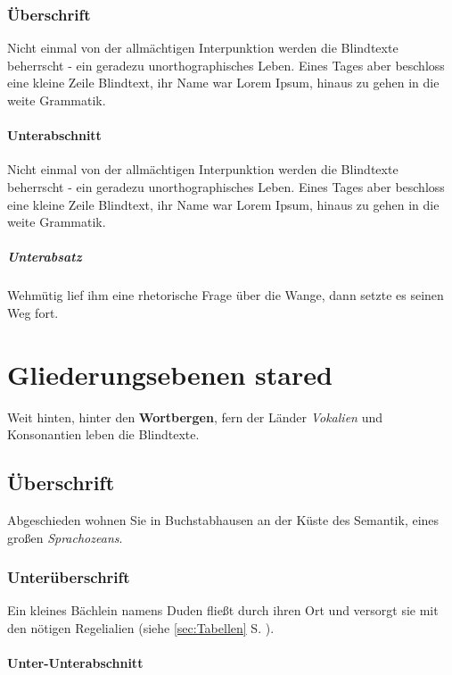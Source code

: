 \documentclass[%
	12pt,%
	a4paper,%
	oneside,%
	liststotoc, idxtotoc, bibtotoc, %
	parskip=half,%
	nochapterprefix,%
	appendixprefix, %
	headings=small,%
]{scrreprt}
\begin{document}
\subsection{Überschrift}
Nicht einmal von der allmächtigen Interpunktion werden die Blindtexte beherrscht - ein geradezu unorthographisches Leben. Eines Tages aber beschloss eine kleine Zeile Blindtext, ihr Name war Lorem Ipsum, hinaus zu gehen in die weite Grammatik.

\subsubsection{Unterabschnitt}
Nicht einmal von der allmächtigen Interpunktion werden die Blindtexte beherrscht - ein geradezu unorthographisches Leben. Eines Tages aber beschloss eine kleine Zeile Blindtext, ihr Name war Lorem Ipsum, hinaus zu gehen in die weite Grammatik.

\paragraph{Unterabsatz}
Wehmütig lief ihm eine rhetorische Frage über die Wange, dann setzte es seinen Weg fort.
\chapter*{Gliederungsebenen stared}
\label{sec:Gliederung3}

Weit hinten, hinter den \textbf{Wortbergen}, fern der Länder \textit{Vokalien} und Konsonantien leben die Blindtexte.

\section*{Überschrift}

Abgeschieden wohnen Sie in Buchstabhausen an der Küste des Semantik, eines großen \textsl{Sprachozeans}. 

\subsection*{Unterüberschrift}

Ein kleines Bächlein namens Duden fließt durch ihren Ort und versorgt sie mit den nötigen Regelialien (siehe \ref{sec:Tabellen} S. \pageref{sec:Tabellen}).

\subsubsection*{Unter-Unterabschnitt}
\end{document}
